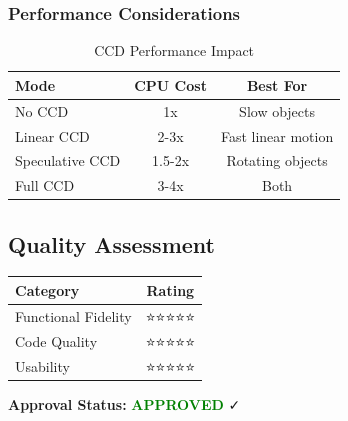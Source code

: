 \subsubsection{Performance Considerations}

\begin{table}[h]
\centering
\begin{tabular}{|l|c|c|}
\hline
\textbf{Mode} & \textbf{CPU Cost} & \textbf{Best For} \\
\hline
No CCD & 1x & Slow objects \\
Linear CCD & 2-3x & Fast linear motion \\
Speculative CCD & 1.5-2x & Rotating objects \\
Full CCD & 3-4x & Both \\
\hline
\end{tabular}
\caption{CCD Performance Impact}
\end{table}


\subsection{Quality Assessment}

\begin{table}[h]
\centering
\begin{tabular}{|l|c|}
\hline
\textbf{Category} & \textbf{Rating} \\
\hline
Functional Fidelity & ⭐⭐⭐⭐⭐ \\
Code Quality & ⭐⭐⭐⭐⭐ \\
Usability & ⭐⭐⭐⭐⭐ \\
\hline
\end{tabular}
\end{table}

\textbf{Approval Status:} \textcolor{green}{\textbf{APPROVED}} ✓

